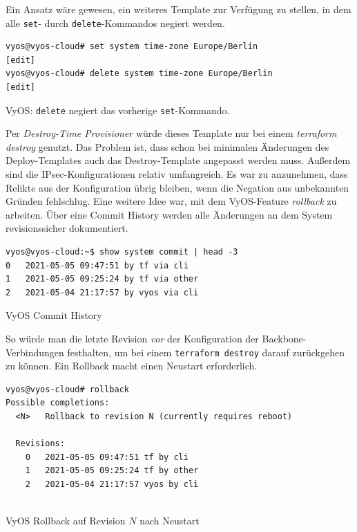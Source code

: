 Ein Ansatz wäre gewesen, ein weiteres Template zur Verfügung zu stellen, in dem alle \texttt{set}- durch \texttt{delete}-Kommandos negiert werden.\\
\begin{listing}[h]
\begin{verbatim}
vyos@vyos-cloud# set system time-zone Europe/Berlin
[edit]
vyos@vyos-cloud# delete system time-zone Europe/Berlin
[edit]
\end{verbatim}
\caption{VyOS: \texttt{delete} negiert das vorherige \texttt{set}-Kommando.}
\label{set-delete-vyos}
\end{listing}\FloatBarrier
Per \textit{Destroy-Time Provisioner} würde dieses Template nur bei einem \textit{terraform destroy} genutzt\cite{destroytimeprovtf2021}. Das Problem ist, dass schon bei minimalen Änderungen des Deploy-Templates auch das Destroy-Template angepasst werden muss.
Außerdem sind die IPsec-Konfigurationen relativ umfangreich. Es war zu anzunehmen, dass Relikte aus der Konfiguration übrig bleiben, wenn die Negation aus unbekannten Gründen fehlschlug.
Eine weitere Idee war, mit dem VyOS-Feature \textit{rollback} zu arbeiten. Über eine Commit History werden alle Änderungen an dem System revisionssicher dokumentiert.
\begin{listing}[h]
\begin{verbatim}
vyos@vyos-cloud:~$ show system commit | head -3
0   2021-05-05 09:47:51 by tf via cli
1   2021-05-05 09:25:24 by tf via other
2   2021-05-04 21:17:57 by vyos via cli

\end{verbatim}
\caption{VyOS Commit History}
\label{commit-history-vyos}
\end{listing}\FloatBarrier
So würde man die letzte Revision \textit{vor} der Konfiguration der Backbone-Verbindungen festhalten, um bei einem \texttt{terraform destroy} darauf zurückgehen zu können. Ein Rollback macht einen Neustart erforderlich.
\begin{listing}[h]
\begin{verbatim}
vyos@vyos-cloud# rollback
Possible completions:
  <N>   Rollback to revision N (currently requires reboot)

  Revisions:
    0   2021-05-05 09:47:51 tf by cli
    1   2021-05-05 09:25:24 tf by other
    2   2021-05-04 21:17:57 vyos by cli
    
\end{verbatim}
\caption{VyOS Rollback auf Revision $N$ nach Neustart}
\label{rollback-cmd-vyos}
\end{listing}\FloatBarrier
